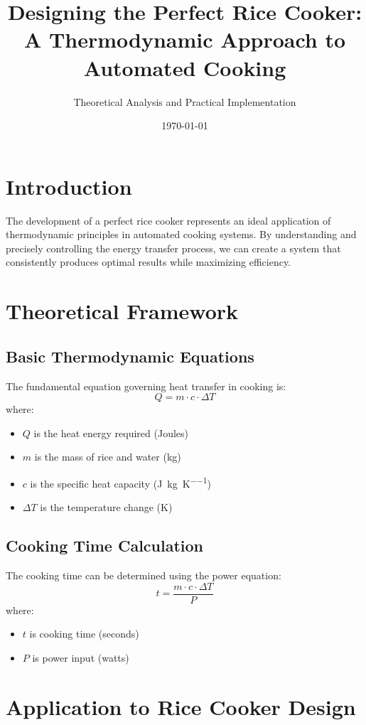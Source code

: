 \documentclass{article}
\title{Designing the Perfect Rice Cooker: \\A Thermodynamic Approach to Automated Cooking}
\author{Theoretical Analysis and Practical Implementation}
\date{\today}
\begin{document}
\maketitle

\section{Introduction}
The development of a perfect rice cooker represents an ideal application of thermodynamic principles in automated cooking systems. By understanding and precisely controlling the energy transfer process, we can create a system that consistently produces optimal results while maximizing efficiency.

\section{Theoretical Framework}
\subsection{Basic Thermodynamic Equations}
The fundamental equation governing heat transfer in cooking is:
\[
Q = m \cdot c \cdot \Delta T
\]
where:
\begin{itemize}
    \item $Q$ is the heat energy required (Joules)
    \item $m$ is the mass of rice and water (kg)
    \item $c$ is the specific heat capacity (\si{\joule\per\kilogram\per\kelvin})
    \item $\Delta T$ is the temperature change (K)
\end{itemize}

\subsection{Cooking Time Calculation}
The cooking time can be determined using the power equation:
\[
t = \frac{m \cdot c \cdot \Delta T}{P}
\]
where:
\begin{itemize}
    \item $t$ is cooking time (seconds)
    \item $P$ is power input (watts)
\end{itemize}

\section{Application to Rice Cooker Design}
\end{document}
